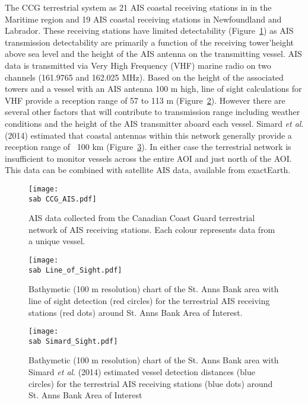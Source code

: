 \documentclass[letterpaper,portrait,11pt]{scrartcl}
\numberwithin{equation}{section}		%
\numberwithin{figure}{section}		%
\numberwithin{table}{section}				%
\newcommand{\ecomod}{\string~/ecomod_data/}   %
\newcommand{\sab}{\ecomod/mpa/sab/}   %
\begin{document}
The CCG terrestrial system as 21 AIS coastal receiving stations in in the Maritime region and 19 AIS coastal receiving stations in Newfoundland and Labrador.  These receiving stations have limited detectability (Figure~\ref{fig:TAIS}) as AIS transmission detectability are primarily a function of the receiving tower\textquoteright height above sea level and the height of the AIS antenna on the transmitting vessel.  AIS data is transmitted via Very High Frequency (VHF) marine radio on two channels (161.9765 and 162.025 MHz).  Based on the height of the associated towers and a vessel with an AIS antenna 100 m high, line of sight calculations for VHF provide a reception range of  57 to 113 m (Figure~\ref{fig:LOF}).  However there are several other factors that will contribute to transmission range including weather conditions and the height of the AIS transmitter aboard each vessel.  Simard \textit{et al}. (2014) estimated that coastal antennas within this network generally provide a reception range of ~100 km (Figure~\ref{fig:DetAIS}).  In either case the terrestrial network is insufficient to monitor vessels across the entire AOI and just north of the AOI. This data can be combined with satellite AIS data, available from exactEarth.


\begin{figure}[h]
	\label{fig:TAIS}
  \centering
	\texttt{[image: \\sab CCG\_AIS.pdf]}
	\caption{AIS data collected from the Canadian Coast Guard terrestrial network of AIS receiving stations.  Each colour represents data from a unique vessel.}
\end{figure}


\begin{figure}[h]
	\label{fig:LOF}
	\centering
	\texttt{[image: \\sab Line\_of\_Sight.pdf]}
	\caption{Bathymetic (100 m resolution) chart of the  St. Anns Bank area with line of sight detection (red circles) for the terrestrial AIS receiving stations (red dots) around St. Anns Bank Area of Interest.}
\end{figure}

\begin{figure}[h]
	\label{fig:DetAIS}
	\centering
	\texttt{[image: \\sab Simard\_Sight.pdf]}
	\caption{Bathymetic (100 m resolution) chart of the  St. Anns Bank area with Simard \textit{et al}. (2014) estimated vessel detection distances (blue circles) for the terrestrial AIS receiving stations (blue dots) around St. Anns Bank Area of Interest}
\end{figure}
\end{document}
